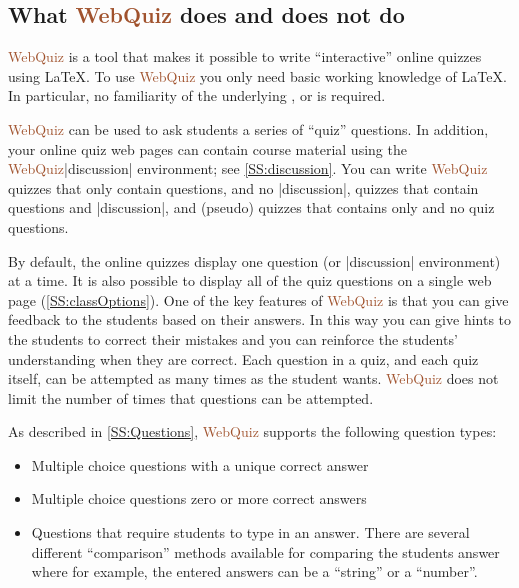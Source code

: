 \documentclass[svgnames]{article}
\newcommand\WebQuiz{\textcolor{Sienna}{WebQuiz}\xspace}
\begin{document}
  \subsection{What \WebQuiz does and does not do}

      \WebQuiz is a tool that makes it possible to write ``interactive''
      online quizzes using \LaTeX{}. To use \WebQuiz you only need
      basic working knowledge of \LaTeX{}. In particular, no familiarity
      of the underlying \CSS, \HTML or \Javascript is required.

      \WebQuiz can be used to ask students a series of ``quiz''
      questions. In addition, your online quiz web pages can contain
      course material using the \WebQuiz \LaTeXCode|discussion|
      environment; see \autoref{SS:discussion}. You can write \WebQuiz
      quizzes that only contain questions, and no
      \LaTeXCode|discussion|, quizzes that contain questions and
      \LaTeXCode|discussion|, and (pseudo) quizzes that contains only
       and no quiz questions.

      By default, the online quizzes display one question (or
      \LaTeXCode|discussion| environment) at a time.  It is also possible
      to display all of the quiz questions on a single web page
      (\autoref{SS:classOptions}). One of the key features of \WebQuiz is
      that you can give feedback to the students based on their answers.
      In this way you can give hints to the students to correct their
      mistakes and you can reinforce the students' understanding when they
      are correct. Each question in a quiz, and each quiz itself, can be
      attempted as many times as the student wants. \WebQuiz does not
      limit the number of times that questions can be attempted.

      As described in \autoref{SS:Questions}, \WebQuiz  supports the following question types:
      \begin{itemize}
        \item Multiple choice questions with a unique correct answer
        \item Multiple choice questions zero or more correct answers
        \item Questions that require students to type in an answer. There
        are several different ``comparison'' methods available for
        comparing the students answer where
        for example, the entered answers can be a ``string'' or a ``number''.
      \end{itemize}
\end{document}
